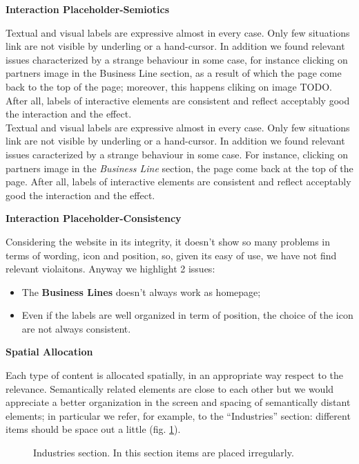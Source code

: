 \textbf{Interaction Placeholder-Semiotics}\par
Textual and visual labels are expressive almost in every case. Only few situations link are not visible by underling or a hand-cursor. In addition we found relevant issues characterized by a strange behaviour in some case, for instance clicking on partners image in the Business Line section, as a result of which the page come back to the top of the page; moreover, this happens cliking on image TODO. After all, labels of interactive elements are consistent and reflect acceptably good the interaction and the effect.\\
Textual and visual labels are expressive almost in every case. Only few situations link are not visible by underling or a hand-cursor. In addition we found relevant issues caracterized by a strange behaviour in some case. For instance, clicking on partners image in the \textit{Business Line} section, the page come back at the top of the page. 
After all, labels of interactive elements are consistent and reflect acceptably good the interaction and the effect.
\medskip

\textbf{Interaction Placeholder-Consistency}\par
Considering the website in its integrity, it doesn’t show so many problems in terms of wording, icon and position, so, given its easy of use, we have not find relevant violaitons. 
Anyway we highlight 2 issues:
\begin{itemize}
\item The \textbf{Business Lines} doesn’t always work as homepage;
\item Even if the labels are well organized in term of position, the choice of the icon are not always consistent.
\end{itemize}
\medskip

\textbf{Spatial Allocation}\par
Each type of content is allocated spatially, in an appropriate way respect to the relevance. Semantically related elements are close to each other but we would appreciate a better organization in the screen and spacing of semantically distant elements; in particular we refer, for example, to the “Industries” section: different items should be space out a little (fig. \ref{space}). 

\begin{figure}[H]
  \centering
    \caption{Industries section. In this section items are placed irregularly.}
    \label{space}
\end{figure}


